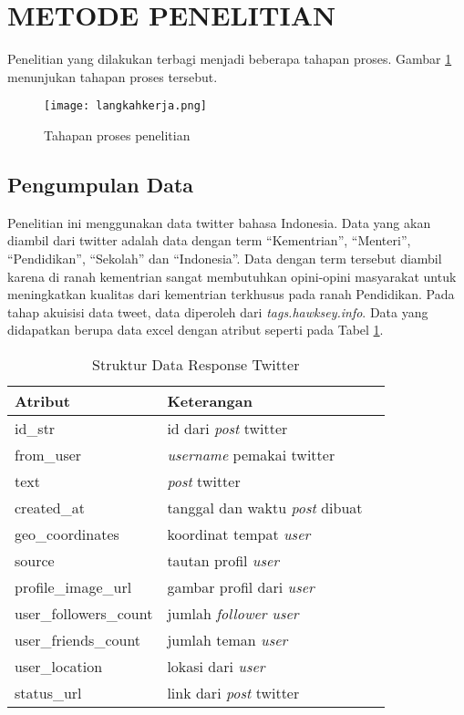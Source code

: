 
\section*{METODE PENELITIAN}

Penelitian yang dilakukan terbagi menjadi beberapa tahapan proses. Gambar \ref{fig:tahapan} menunjukan tahapan proses tersebut.

\begin{figure}[h!] %
	\centering
	\texttt{[image: langkahkerja.png]}
	\caption{Tahapan proses penelitian}
	\label{fig:tahapan}
\end{figure}

\subsection*{Pengumpulan Data}

Penelitian ini menggunakan data twitter bahasa Indonesia. Data yang akan diambil dari twitter adalah data dengan term “Kementrian”, “Menteri”, “Pendidikan”, “Sekolah” dan “Indonesia”. Data dengan term tersebut diambil karena di ranah kementrian sangat membutuhkan opini-opini masyarakat untuk meningkatkan kualitas dari kementrian terkhusus pada ranah Pendidikan. 
Pada tahap akuisisi data tweet, data diperoleh dari \textit{tags.hawksey.info}. Data yang didapatkan berupa data excel dengan atribut seperti pada Tabel \ref{tab:strukturdatatwitter}.

\begin{table}[hbt]
	\caption{Struktur Data Response Twitter}
	\centering
	\begin{tabular}{llr}
		
		\cmidrule(r){1-2}
		Atribut & Keterangan \\
		\midrule
		id\_str & id dari \textit{post} twitter \\
		from\_user & \textit{username} pemakai twitter \\
		text & \textit{post} twitter \\
		created\_at & tanggal dan waktu \textit{post} dibuat \\
		geo\_coordinates & koordinat tempat \textit{user} \\
		source & tautan profil \textit{user} \\
		profile\_image\_url & gambar profil dari \textit{user} \\
		user\_followers\_count & jumlah \textit{follower user} \\
		user\_friends\_count & jumlah teman \textit{user} \\
		user\_location & lokasi dari \textit{user} \\
		status\_url & link dari \textit{post} twitter \\
		
		\bottomrule
	\end{tabular}
	\label{tab:strukturdatatwitter}
\end{table}

